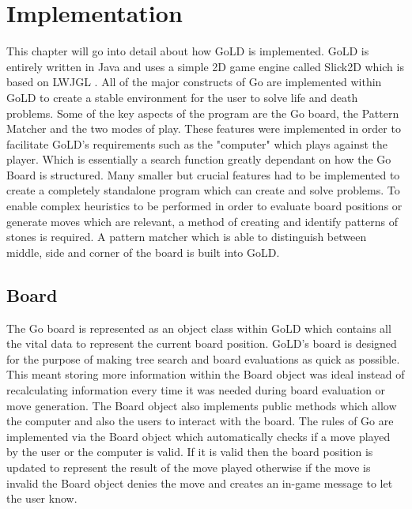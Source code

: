 \documentclass{l4proj}
\begin{document}
\chapter{Implementation}
This chapter will go into detail about how GoLD is implemented. GoLD is entirely written in Java and uses a simple 2D game engine called Slick2D \cite{SLICK2D} which is based on LWJGL \cite{SLICK2D}. All of the major constructs of Go are implemented within GoLD to create a stable environment for the user to solve life and death problems. Some of the key aspects of the program are the Go board, the Pattern Matcher and the two modes of play. These features were implemented in order to facilitate GoLD's requirements such as the "computer" which plays against the player. Which is essentially a search function greatly dependant on how the Go Board is structured. Many smaller but crucial features had to be implemented to create a completely standalone program which can create and solve problems. To enable complex heuristics to be performed in order to evaluate board positions or generate moves which are relevant, a method of creating and identify patterns of stones is required. A pattern matcher which is able to distinguish between middle, side and corner of the board is built into GoLD.

\section{Board}

The Go board is represented as an object class within GoLD which contains all the vital data to represent the current board position. GoLD's board is designed for the purpose of making tree search and board evaluations as quick as possible. This meant storing more information within the Board object was ideal instead of recalculating information every time it was needed during board evaluation or move generation. The Board object also implements public methods which allow the computer and also the users to interact with the board. The rules of Go are implemented via the Board object which automatically checks if a move played by the user or the computer is valid. If it is valid then the board position is updated to represent the result of the move played otherwise if the move is invalid the Board object denies the move and creates an in-game message to let the user know.
\end{document}
